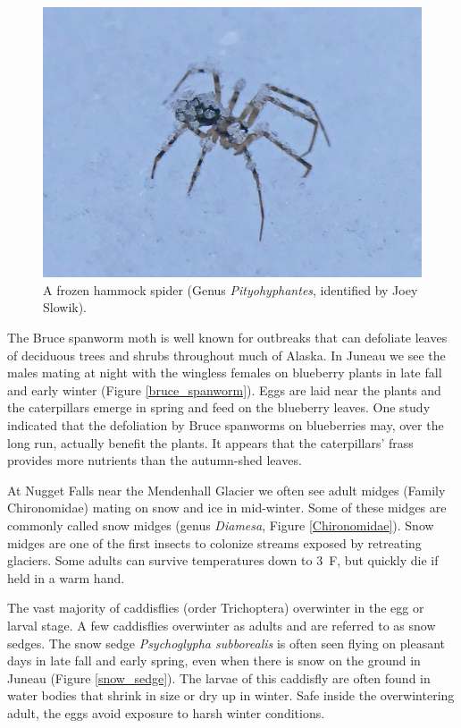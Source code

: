 \begin{multicols}{2}
\begin{figure}[H]
\begin{center}
\vspace{2mm}
\includegraphics[width=\textwidth]{img/Pityohyphantes.jpg}
\caption{A frozen hammock spider (Genus \textit{Pityohyphantes}, identified by Joey Slowik).}
\label{Pityohyphantes}
\end{center}
\end{figure}

The Bruce spanworm moth is well known for outbreaks that can defoliate leaves of deciduous trees and shrubs throughout much of Alaska. In Juneau we see the males mating at night with the wingless females on blueberry plants in late fall and early winter (Figure \ref{bruce_spanworm}). Eggs are laid near the plants and the caterpillars emerge in spring and feed on the blueberry leaves. One study indicated that the defoliation by Bruce spanworms on blueberries may, over the long run, actually benefit the plants. It appears that the caterpillars’ frass provides more nutrients than the autumn-shed leaves.

At Nugget Falls near the Mendenhall Glacier we often see adult midges (Family Chironomidae) mating on snow and ice in mid-winter. Some of these midges are commonly called snow midges (genus \textit{Diamesa}, Figure \ref{Chironomidae}). Snow midges are one of the first insects to colonize streams exposed by retreating glaciers. Some adults can survive temperatures down to 3~\textdegree{}F, but quickly die if held in a warm hand.

The vast majority of caddisflies (order Trichoptera) overwinter in the egg or larval stage. A few caddisflies overwinter as adults and are referred to as snow sedges. The snow sedge \textit{Psychoglypha subborealis} is often seen flying on pleasant days in late fall and early spring, even when there is snow on the ground in Juneau (Figure \ref{snow_sedge}). The larvae of this caddisfly are often found in water bodies that shrink in size or dry up in winter. Safe inside the overwintering adult, the eggs avoid exposure to harsh winter conditions. 


\end{multicols}
